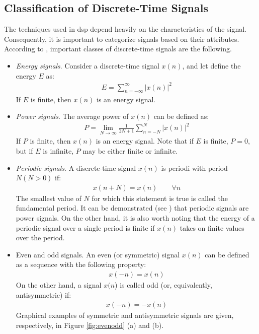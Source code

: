 \subsection{Classification of Discrete-Time Signals}
The techniques used in \gls{dsp} depend heavily on the characteristics of the signal. Consequently, it is important to categorize signals based on their attributes. According to \cite{proakis2006dimitris}, important classes of discrete-time signals are the following.
\begin{itemize}
	\item \textit{Energy signals}. Consider a discrete-time signal $x(n)$, and let define the energy $E$ as:
	\begin{align}
		E =\sum_{n = -\infty}^{\infty} |x(n)|^2
	\end{align}
	If $E$ is finite, then $x(n)$ is an energy signal.
	\item \textit{Power signals}. The average power of $x(n)$ can be defined as:
	\begin{align}
	P=\lim _{N \rightarrow \infty} \frac{1}{2 N+1} \sum_{n=-N}^{N}|x(n)|^{2}
	\end{align}
	If $P$ is finite, then $x(n)$ is an energy signal.	Note that if $E$ is finite, $P = 0$, but if $E$ is infinite, $P$ may be either finite or infinite.
	\item \textit{Periodic signals}. A discrete-time signal $x(n)$ is periodi with period $N (N>0)$ if:
	\begin{align}
		x(n + N) = x(n) \qquad \forall n
	\end{align}
	The smallest value of $N$ for which this statement is true is called the fundamental period. It can be demonstrated (see \cite{proakis2006dimitris}) that  periodic signals are power signals. On the other hand, it is also worth noting that the energy of a periodic signal over a single period is finite if $x(n)$ takes on finite values over the period. 
	\item {Even and odd signals}. An even (or symmetric) signal $x(n)$ can be defined as a sequence with the following property:
	\begin{align}
		x(-n) = x(n)
	\end{align}
	On the other hand, a signal $x(n$) is called odd (or, equivalently, antisymmetric) if:
	\begin{align}
		x(-n) = -x(n)
	\end{align}
	Graphical examples of symmetric and antisymmetric signals are given, respectively, in Figure \ref{fig:evenodd} (a) and (b).

\end{itemize}
